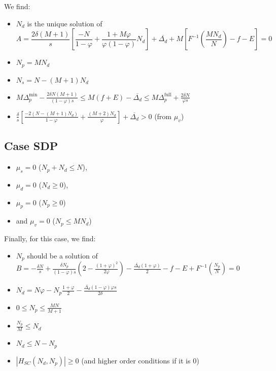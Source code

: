 \documentclass[english, a4paper]{article}
\theoremstyle{plain}
\theoremstyle{definition}
\theoremstyle{remark}
\begin{document}
We find:
\begin{itemize}
    \item $N_d$ is the unique solution of
    \begin{equation}
    \label{equation:SDPmax_Nd_equation}
    A = \frac{2\delta (M+1)}{s} \left[ \frac{-N}{1-\varphi} + \frac{1 + M\varphi}{\varphi(1-\varphi)}N_d \right] + \overline{\Delta_d} + M \left[ F^{-1}\left( \frac{MN_d}{N} \right) - f - E \right] = 0
    \end{equation}
    \item $N_p = MN_d$
    \item $N_s = N - (M+1) N_d$
    \item $M\Delta_p^{\text{min}} -\frac{2\delta N(M+1)}{(1-\varphi)s} \leq M(f+E) - \overline{\Delta_d} \leq M\Delta_p^{\text{full}} + \frac{2\delta N}{\varphi s}$
    \item $\frac{\delta}{s} \left[ \frac{-2(N - (M+1)N_d)}{1 -\varphi} + \frac{(M+2)N_d}{\varphi} \right] + \overline{\Delta_d} > 0$ (from $\mu_v$)
\end{itemize}

\subsection{Case SDP}

\begin{itemize}
    \item $\mu_s = 0$ ($N_p + N_d \leq N$),
    \item $\mu_d = 0$ ($N_d \geq 0$),
    \item $\mu_p = 0$ ($N_p \geq 0$)
    \item and $\mu_v = 0$ ($N_p \leq MN_d$)
\end{itemize}

Finally, for this case, we find:
\begin{itemize}
    \item $N_p$ should be a solution of $B = -\frac{\delta N}{s} + \frac{\delta N_p}{(1-\varphi)s} \left( 2 - \frac{(1+\varphi)^2}{2\varphi} \right) - \frac{\overline{\Delta_d} (1+\varphi)}{2} - f - E + F^{-1}\left( \frac{N_p}{N} \right) = 0$
    \item $N_d = N\varphi - N_p\frac{1+\varphi}{2} - \frac{\overline{\Delta_d} (1-\varphi)\varphi s}{2\delta}$
    \item $0 \leq N_p \leq \frac{MN}{M+1}$
    \item $\frac{N_p}{M} \leq N_d$
    \item $N_d \leq N - N_p$
    \item $|H_{SC}(N_d, N_p)| \geq 0$ (and higher order conditions if it is $0$)
\end{itemize}
\end{document}
